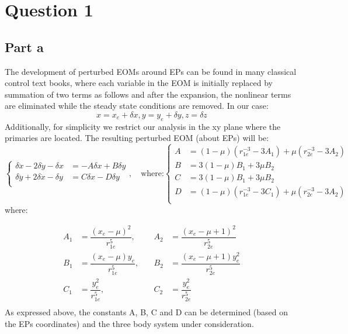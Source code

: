 \section{Question 1}
\subsection{Part a}
The development of perturbed EOMs around EPs can be found in many classical control text books, where each variable in the EOM is initially replaced by summation of two terms as follows and after the expansion, the nonlinear terms are eliminated while the steady state conditions are removed. In our case:
$$
x = x_e + \delta x, y = y_e + \delta y, z = \delta z
$$
Additionally, for simplicity we restrict our analysis in the xy plane where the primaries are located. The resulting perturbed EOM (about EPs) will be:
\begin{equation}
    \begin{cases}
        \delta \ddot{x} - 2\delta \dot{y} - \delta x &= -A\delta x+ B \delta y\\
        \delta \ddot{y} + 2\delta \dot{x} - \delta y & = C\delta x- D \delta y\\
    \end{cases}, \quad \text{where:} \begin{cases}
        A &= (1-\mu)\left(r_{1e}^{-3} - 3A_1\right)+ \mu\left(r_{2e}^{-3}-3A_2\right)\\
        B  &= 3(1-\mu)B_1 + 3\mu B_2\\
        C &= 3(1-\mu)B_1 + 3\mu B_2\\
        D &= (1-\mu)\left(r_{1e}^{-3} - 3C_1\right)+ \mu\left(r_{2e}^{-3}-3A_2\right)\\
    \end{cases}
\end{equation}
where:

\begin{align*}
    A_1 &= \dfrac{(x_e-\mu)^2}{r_{1e}^5}, \quad &A_2 &= \dfrac{(x_e-\mu+1)^2}{r_{2e}^5}\\
    B_1 &= \dfrac{(x_e-\mu)y_e}{r_{1e}^5}, \quad &B_2 &= \dfrac{(x_e-\mu+1)y_e^2}{r_{2e}^5}\\
    C_1 &= \dfrac{y_e^2}{r_{1e}^5}, \quad &C_2 &= \dfrac{y_e^2}{r_{2e}^5}\\
\end{align*}
As expressed above, the constants A, B, C and D can be determined (based on the EPs coordinates) and the three body system under consideration.

